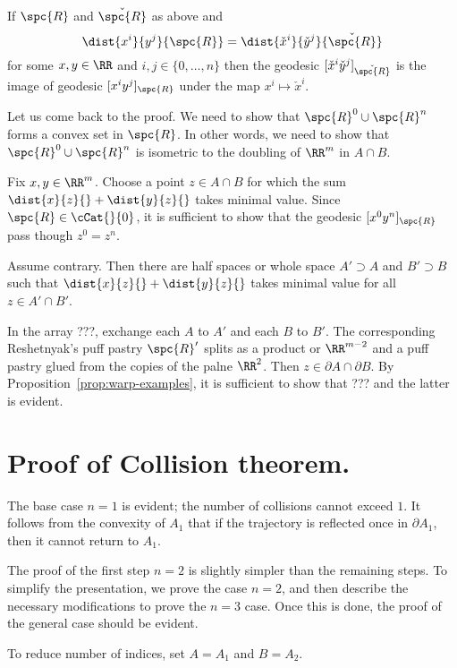 \begin{clm}{}
If  $\spc{R}$ and $\check{\spc{R}}$ as above and
\[\dist{x^i}{y^j}{\spc{R}}=\dist{\check x^i}{\check y^j}{\check{\spc{R}}}\]
for some $x,y\in \RR$ and $i,j\in \{0,\dots,n\}$
then the geodesic $[\check x^i \check y^j]_{\check{\spc{R}}}$ 
is the image of geodesic $[x^i y^j]_{\spc{R}}$
under the map $x^i\mapsto \check x^i$.
\end{clm}


Let us come back to the proof.
We need to show that $\spc{R}^0\cup\spc{R}^n$ forms a convex set in $\spc{R}$.
In other words, we need to show that $\spc{R}^0\cup\spc{R}^n$
is isometric to the doubling of $\RR^m$ in $A\cap B$. 

Fix $x,y\in \RR^m$.
Choose a point $z\in A\cap B$
for which the sum $\dist{x}{z}{}+\dist{y}{z}{}$ takes minimal value.
Since $\spc{R}\in\cCat{}{0}$, it is sufficient to show that the geodesic $[x^0y^n]_\spc{R}$ pass though $z^0=z^n$.

Assume contrary.
Then there are half spaces or whole space
$A'\supset A$ and $B'\supset B$
such that $\dist{x}{z}{}+\dist{y}{z}{}$ takes minimal value
for all $z\in A'\cap B'$.

In the array ???, 
exchange each $A$ to $A'$ and each $B$ to $B'$.
The corresponding Reshetnyak's puff pastry $\spc{R}'$
splits as a product or $\RR^{m-2}$ and a puff pastry
glued from the copies of the palne $\RR^2$.
Then $z\in\partial A\cap\partial B$.
By Proposition~\ref{prop:warp-examples},
it is sufficient to show that ???
and the latter is evident.



\section{Proof of Collision theorem.}


The base case $n=1$ is evident; the number of collisions cannot exceed $1$.  
It follows from the convexity of $A_1$ that
if the trajectory is reflected once in $\partial A_1$, 
then it cannot return to $A_1$.

The proof of the first step $n=2$ is slightly simpler than the remaining steps.
To simplify the presentation, we prove the case $n=2$, 
and then describe the necessary modifications to prove the $n=3$ case.
Once this is done, the proof of the general case should be evident.

 To reduce number of indices, set $A=A_1$ and $B=A_2$. 

